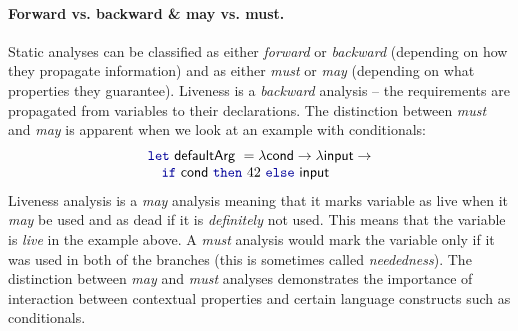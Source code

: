\paragraph{Forward vs. backward \& may vs. must.}
Static analyses can be classified as either \emph{forward} or \emph{backward} (depending on how they 
propagate information) and as either \emph{must} or \emph{may} (depending on what properties they
guarantee). Liveness is a \emph{backward} analysis -- the requirements are propagated from variables 
to their declarations. The distinction between \emph{must} and \emph{may} is apparent when we look 
at an example with conditionals:
%
\begin{equation*}
\begin{array}{l}
\kvd{let}~\ident{defaultArg}~= \lambda \ident{cond} \rightarrow \lambda \ident{input} \rightarrow\\
\quad\kvd{if}~\ident{cond}~\kvd{then}~42~\kvd{else}~\ident{input}
\end{array}
\end{equation*}
%
Liveness analysis is a \emph{may} analysis meaning that it marks variable as live when it
\emph{may} be used and as dead if it is \emph{definitely} not used. This means that the variable
 is \emph{live} in the example above. A \emph{must} analysis would mark the variable
only if it was used in both of the branches (this is sometimes called \emph{neededness}).
The distinction between \emph{may} and \emph{must} analyses demonstrates the importance of 
interaction between contextual properties and certain language constructs such as conditionals.


